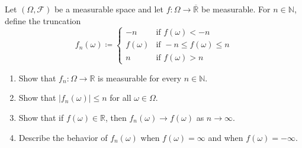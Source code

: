 \begin{proposition} %
Let $(\Omega, \mathcal{F})$ be a measurable space and let $f: \Omega \rightarrow \overline{\mathbb{R}}$ be measurable. 
For $n \in \mathbb{N}$, define the truncation
\[
f_n(\omega) 
\coloneq 
\begin{cases}
  -n & \text{if } f(\omega) < -n \\
  f(\omega) & \text{if } -n \leq f(\omega) \leq n \\
  n & \text{if } f(\omega) > n
\end{cases}
\]
\begin{enumerate}[label=(\alph*)]
\item
Show that $f_n: \Omega \rightarrow \mathbb{R}$ is measurable for every $n \in \mathbb{N}$.
\item
Show that
\(
\left|f_n(\omega)\right| \leq n 
\)
for all
\(
\omega \in \Omega
\).
\item
Show that if $f(\omega) \in \mathbb{R}$, then
\(
f_n(\omega) \rightarrow f(\omega)
\) 
as
\(
 n \rightarrow \infty 
\).
\item
Describe the behavior of $f_n(\omega)$ when $f(\omega)=\infty$ and when $f(\omega)=-\infty$.
\qedhere
\end{enumerate}
\end{proposition}

